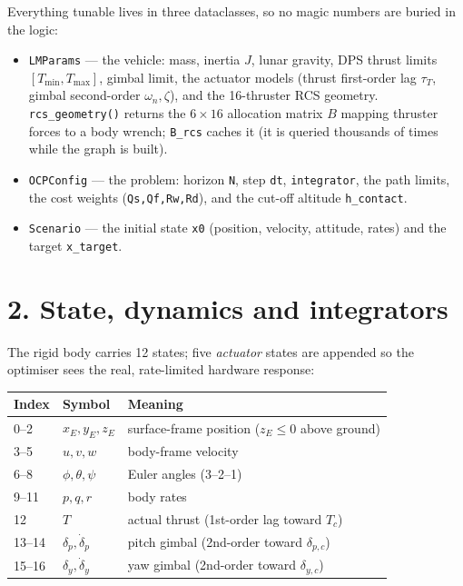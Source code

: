 \documentclass[11pt]{article}
\newcommand{\code}[1]{\texttt{#1}}
\begin{document}
Everything tunable lives in three dataclasses, so no magic numbers are buried in
the logic:
\begin{itemize}\itemsep2pt
  \item \code{LMParams} --- the vehicle: mass, inertia $J$, lunar gravity, DPS
        thrust limits $[T_{\min},T_{\max}]$, gimbal limit, the actuator models
        (thrust first-order lag $\tau_T$, gimbal second-order $\omega_n,\zeta$),
        and the 16-thruster RCS geometry. \code{rcs\_geometry()} returns the
        $6\times16$ allocation matrix $B$ mapping thruster forces to a body
        wrench; \code{B\_rcs} caches it (it is queried thousands of times while
        the graph is built).
  \item \code{OCPConfig} --- the problem: horizon \code{N}, step \code{dt},
        \code{integrator}, the path limits, the cost weights
        (\code{Qs,Qf,Rw,Rd}), and the cut-off altitude \code{h\_contact}.
  \item \code{Scenario} --- the initial state \code{x0} (position, velocity,
        attitude, rates) and the target \code{x\_target}.
\end{itemize}

\section*{2. State, dynamics and integrators}

The rigid body carries 12 states; five \emph{actuator} states are appended so the
optimiser sees the real, rate-limited hardware response:

\begingroup\small
\begin{center}
\begin{tabular}{@{}lll@{}}
\toprule
Index & Symbol & Meaning\\
\midrule
0--2   & $x_E,y_E,z_E$ & surface-frame position ($z_E\le0$ above ground)\\
3--5   & $u,v,w$       & body-frame velocity\\
6--8   & $\phi,\theta,\psi$ & Euler angles (3--2--1)\\
9--11  & $p,q,r$       & body rates\\
12     & $T$           & actual thrust (1st-order lag toward $T_c$)\\
13--14 & $\delta_p,\dot\delta_p$ & pitch gimbal (2nd-order toward $\delta_{p,c}$)\\
15--16 & $\delta_y,\dot\delta_y$ & yaw gimbal (2nd-order toward $\delta_{y,c}$)\\
\bottomrule
\end{tabular}
\end{center}
\endgroup
\end{document}
